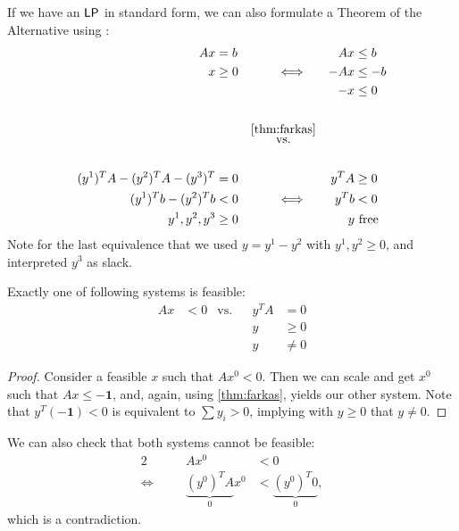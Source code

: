 \begin{remark}
    If we have an $\mathsf{LP}$ in standard form, we can also formulate a Theorem of the Alternative using :
    \begin{alignat*}{3}
        Ax                            & = b    &                                        &  & Ax   & \leq b       \\
        x                             & \geq 0 & \quad \Longleftrightarrow \quad        &  & -Ax  & \leq -b      \\
                                      &        &                                        &  & -x   & \leq 0       \\\\
                                      &        & \overset{\ref{thm:farkas}}{\text{vs.}}                          \\\\
        (y^1)^TA - (y^2)^TA - (y^3)^T & = 0    &                                        &  & y^TA & \geq 0       \\
        (y^1)^Tb - (y^2)^Tb           & <0     & \quad \Longleftrightarrow \quad        &  & y^Tb & < 0          \\
        y^1,y^2,y^3                   & \geq 0 &                                        &  & y    & \text{ free} \\
    \end{alignat*}
    Note for the last equivalence that we used $y = y^1 - y^2$ with $y^1,y^2 \geq 0$, and interpreted $y^3$ as slack.
\end{remark}
\begin{theorem}
    Exactly one of following systems is feasible:
    \begin{align*}
        Ax & < 0 & \text{vs.} &  & y^TA & = 0    \\
           &     &            &  & y    & \geq 0 \\
           &     &            &  & y    & \neq 0
    \end{align*}
\end{theorem}
\begin{proof}
    Consider a feasible $x$ such that $Ax^0 < 0$.
    Then we can scale and get $x^0$ such that $Ax \leq -\mathbf{1}$, and, again, using \autoref{thm:farkas},
    yields our other system. Note that $y^T(-\mathbf{1})<0$ is equivalent to $\sum y_i > 0$,
    implying with $y \geq 0$ that $y \neq 0$.
\end{proof}
\begin{note}
    We can also check that both systems cannot be feasible:
    \begin{alignat*}{2}
                              &  & Ax^0                         & < 0                          \\
        \Leftrightarrow \quad &  & \underbrace{(y^0)^TA}_{0}x^0 & < \underbrace{(y^0)^T0}_{0},
    \end{alignat*}
    which is a contradiction.
\end{note}
